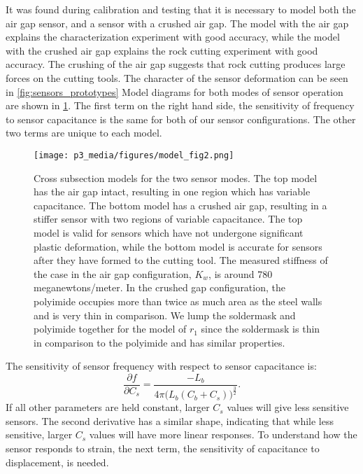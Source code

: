 It was found during calibration and
testing that it is necessary to model both the air gap sensor, and a sensor with a crushed air gap.
The model with the air gap explains the characterization experiment with good accuracy, while the
model with the crushed air gap explains the rock cutting experiment with good accuracy. 
The crushing of the air gap suggests that rock cutting produces large forces on the cutting tools.
The character of the sensor deformation can be seen in \ref{fig:sensors_prototypes}
Model diagrams for both modes of sensor operation are shown in \ref{fig:sensors_models}.
The first term on the right hand side, the sensitivity of frequency to sensor capacitance 
is the same for both of our sensor configurations. The other two terms are unique to each model.

\begin{figure}[t]
\centering
\texttt{[image: p3\_media/figures/model\_fig2.png]}
\caption{Cross subsection models for the two sensor modes. The top model has the air gap intact, 
resulting in one region which has variable capacitance. The bottom model has a crushed air gap, 
resulting in a stiffer sensor with two regions of variable capacitance. The top model is valid 
for sensors which have not undergone significant plastic deformation, while the bottom 
model is accurate for sensors after they have formed to the cutting tool.
The measured stiffness of the case in the air gap configuration, $K_w$, 
is around 780 meganewtons/meter. 
In the crushed gap configuration, the polyimide 
occupies more than twice as much area as the steel walls and is very thin in comparison.
We lump the soldermask and polyimide together for the model of $r_1$ since the soldermask is
thin in comparison to the polyimide and has similar properties. 
}
\label{fig:sensors_models}
\end{figure}

The sensitivity of sensor frequency with respect to sensor capacitance is:
\begin{equation}
\frac{\partial f}{\partial C_s} = \frac {-L_b}{4 \pi \bigg(L_b(C_b + C_s)\bigg)^{\frac{3}{2}}}.
\end{equation}
If all other parameters are held constant, 
larger $C_s$ values will give less sensitive sensors. 
The second derivative has a similar shape, indicating that while less sensitive, 
larger $C_s$ values will have more linear responses. To understand how the sensor
responds to strain, the next term, the sensitivity of capacitance to displacement, is needed.

